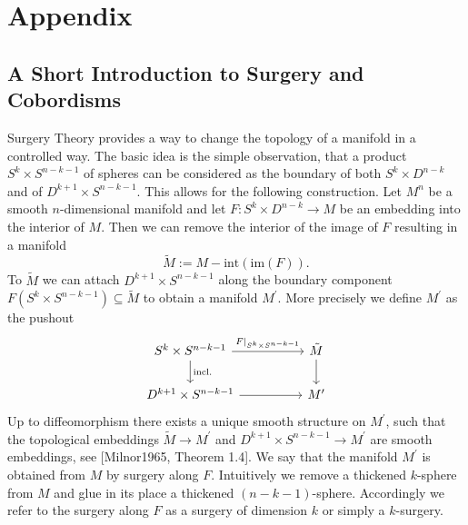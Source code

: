 \appendix
\section{Appendix}
\subsection{A Short Introduction to Surgery and Cobordisms}

Surgery Theory provides a way to change the topology of a manifold in a controlled way. The basic idea is the simple observation, that a product $S^k \times S^{n-k-1}$ of spheres can be considered as the boundary of both $S^k \times D^{n-k}$ and of $D^{k+1} \times S^{n-k-1}$. This allows for the following construction. Let $M^n$ be a smooth $n$-dimensional manifold and let $F \colon S^k \times D^{n-k} \to M$ be an embedding into the interior of $M$. Then we can remove the interior of the image of $F$ resulting in a manifold 
\[
\tilde{M} := M - \mathrm{int}(\mathrm{im}(F)).
\]
To $\tilde{M}$ we can attach $D^{k+1} \times S^{n-k-1}$ along the boundary component $F(S^k \times S^{n-k-1}) \subseteq \tilde{M}$ to obtain a manifold $M^\prime$. More precisely we define $M^\prime$ as the pushout 
\[\begin{tikzcd}[column sep = 1.75cm]
	{S^k \times S^{n-k-1}} & {\tilde{M}} \\
	{D^{k+1} \times S^{n-k-1}} & {M^\prime}
	\arrow["{F|_{S^k \times S^{n-k-1}}}", from=1-1, to=1-2]
	\arrow["{\mathrm{incl.}}", from=1-1, to=2-1]
	\arrow[from=1-2, to=2-2]
	\arrow[from=2-1, to=2-2]
\end{tikzcd}\]
Up to diffeomorphism there exists a unique smooth structure on $M^\prime$, such that the topological embeddings $\tilde{M} \to M^\prime$ and $D^{k+1} \times S^{n-k-1} \to M^\prime$ are smooth embeddings, see [Milnor1965, Theorem 1.4]. We say that the manifold $M^\prime$ is obtained from $M$ by surgery along $F$. Intuitively we remove a thickened $k$-sphere from $M$ and glue in its place a thickened $(n-k-1)$-sphere. Accordingly we refer to the surgery along $F$ as a surgery of dimension $k$ or simply a $k$-surgery. 

